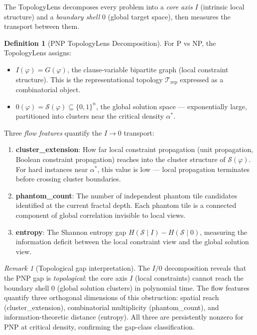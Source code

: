 \documentclass[11pt]{article}
\theoremstyle{definition}
\newtheorem{definition}[theorem]{Definition}
\theoremstyle{remark}
\newtheorem{remark}[theorem]{Remark}
\newcommand{\calS}{\mathcal{S}}
\begin{document}
The TopologyLens decomposes every problem into a \emph{core axis} $I$ (intrinsic
local structure) and a \emph{boundary shell} $0$ (global target space), then
measures the transport between them.

\begin{definition}[PNP TopologyLens Decomposition]
\label{def:pnp-topology-lens}
For P vs NP, the TopologyLens assigns:
\begin{itemize}[nosep]
  \item $I(\varphi) = G(\varphi)$, the clause-variable bipartite graph (local
    constraint structure).  This is the representational topology
    $\mathcal{T}_{\mathrm{rep}}$ expressed as a combinatorial object.
  \item $0(\varphi) = \calS(\varphi) \subseteq \{0,1\}^n$, the global solution
    space --- exponentially large, partitioned into clusters near the critical
    density $\alpha^*$.
\end{itemize}
Three \emph{flow features} quantify the $I \to 0$ transport:
\begin{enumerate}[nosep]
  \item \textbf{cluster\_extension}: How far local constraint propagation
    (unit propagation, Boolean constraint propagation) reaches into the cluster
    structure of $\calS(\varphi)$.  For hard instances near $\alpha^*$, this
    value is low --- local propagation terminates before crossing cluster
    boundaries.
  \item \textbf{phantom\_count}: The number of independent phantom tile
    candidates identified at the current fractal depth.  Each phantom tile
    is a connected component of global correlation invisible to local views.
  \item \textbf{entropy}: The Shannon entropy gap $H(\calS \mid I) - H(\calS \mid 0)$,
    measuring the information deficit between the local constraint view and the
    global solution view.
\end{enumerate}
\end{definition}

\begin{remark}[Topological gap interpretation]
The $I/0$ decomposition reveals that the PNP gap is \emph{topological}: the
core axis $I$ (local constraints) cannot reach the boundary shell $0$ (global
solution clusters) in polynomial time.  The flow features quantify three
orthogonal dimensions of this obstruction: spatial reach (cluster\_extension),
combinatorial multiplicity (phantom\_count), and information-theoretic
distance (entropy).  All three are persistently nonzero for PNP at critical
density, confirming the gap-class classification.
\end{remark}
\end{document}
